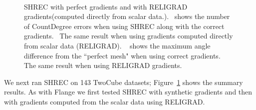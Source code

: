 \begin{figure}[tb] 
	\centering
	\\
	\caption{SHREC with perfect gradients and with RELIGRAD gradients(computed directly from scalar data.).~\protect{} shows the number of CountDegree errors when using SHREC along with the correct gradients.~\protect{} The same result when using gradients computed directly from scalar data (RELIGRAD). ~\protect{} shows the maximum angle difference from the ``perfect mesh" when using correct gradients.~\protect{} The same result when using RELIGRAD gradients. }
	\label{fig:shrecTwoCube}
	\vskip-0.2cm
\end{figure}


We next ran SHREC on 143 TwoCube datasets; Figure~\ref{fig:shrecTwoCube} shows the summary results. As with Flange we first tested SHREC with synthetic gradients and then with gradients computed from the scalar data using RELIGRAD.

